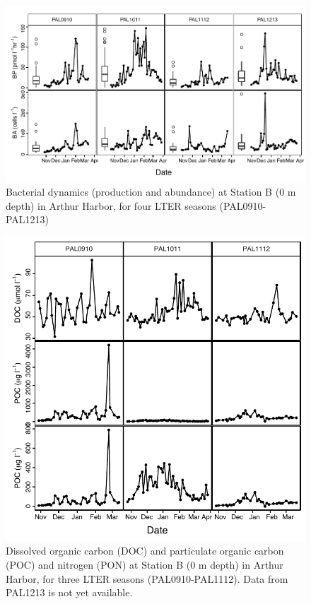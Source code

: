 \begin{figure}[ht!] 
\centering 
\includegraphics[width=1.0\textwidth]{Chapter_5_LTER/Figures/Figure_3_BA_BP}
\caption[Bacterial dynamics (production and abundance) at Station B across four LTER seasons (PAL0910-PAL1213).]{Bacterial dynamics (production and abundance) at Station B (0 m depth) in Arthur Harbor, for four LTER seasons (PAL0910-PAL1213)} 
\label{fig:ch4:ba_bp} 
\end{figure}

\begin{figure}[ht!] 
\centering 
\includegraphics[width=1.0\textwidth]{Chapter_5_LTER/Figures/Figure_4_DOC_POC_PON}
\caption[Dissolved organic carbon and particulate organic carbon and nitrogen at Station B across three LTER seasons (PAL0910-PAL1112).]{Dissolved organic carbon (DOC) and particulate organic carbon (POC) and nitrogen (PON) at Station B (0 m depth) in Arthur Harbor, for three LTER seasons (PAL0910-PAL1112). Data from PAL1213 is not yet available.} 
\label{fig:ch4:doc_poc_pon} 
\end{figure}

